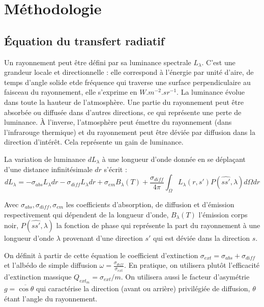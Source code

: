 \section{Méthodologie}

\subsection{Équation du transfert radiatif}

Un rayonnement peut être défini par sa luminance spectrale $L_\lambda$. C'est une grandeur locale et directionnelle : elle correspond à l'énergie par unité d'aire, de temps d'angle solide etde fréquence qui traverse une surface perpendiculaire au faisceau du rayonnement, elle s'exprime en $W.m^{-2}.sr^{-1}$. La luminance évolue dans toute la hauteur de l'atmosphère. Une partie du rayonnement peut être absorbée ou diffusée dans d'autres directions, ce qui représente une perte de luminance. À l'inverse, l'atmosphère peut émettre du rayonnement (dans l'infrarouge thermique) et du rayonnement peut être déviée par diffusion dans la direction d'intérêt. Cela représente un gain de luminance.

La variation de luminance $dL_\lambda$ à une longueur d'onde donnée
en se déplaçant d'une distance infinitésimale $dr$ s'écrit :
\begin{equation}
    dL_\lambda = -\sigma_{abs}L_\lambda dr
    -\sigma_{diff}L_\lambda dr 
    +\sigma_{em}B_\lambda(T)
    +\frac{\sigma_{diff}}{4\pi}\int_\Omega L_\lambda (r,s') P(\widehat{ss'} ,\lambda) d\Omega dr
\end{equation}

Avec $\sigma_{abs},\sigma_{diff},\sigma_{em}$ les coefficients d'absorption,
de diffusion et d'émission respectivement qui dépendent de la longueur d'onde, $B_\lambda(T)$ l'émission corps noir, $P(\widehat{ss'},\lambda)$ la fonction de phase qui représente la part du rayonnement à une longueur d'onde $\lambda$ provenant d'une direction $s'$ qui est déviée dans la direction $s$.

On définit à partir de cette équation le coefficient d'extinction $\sigma_{ext}= \sigma_{abs}+\sigma_{diff}$ et l'albédo de simple diffusion $\omega = \frac{\sigma_{diff}}{\sigma_{ext}}$. En pratique, on utilisera plutôt l'efficacité d'extinction massique $Q_{ext_m} = \sigma_{ext}/m $. On utilisera aussi le facteur d'asymétrie $g= \overline{\cos\theta}$ qui caractérise la direction (avant ou arrière) privilégiée de diffusion, $\theta$ étant l'angle du rayonnement.

